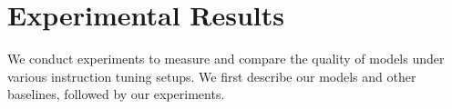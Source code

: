 \documentclass[11pt]{article}
\begin{document}



\label{subsec:quality}



\section{Experimental Results}
\label{sec:superni_results}


We conduct experiments to measure and compare the quality of models under various instruction tuning setups. 
We first describe our models and other baselines, followed by our experiments. 
\end{document}
